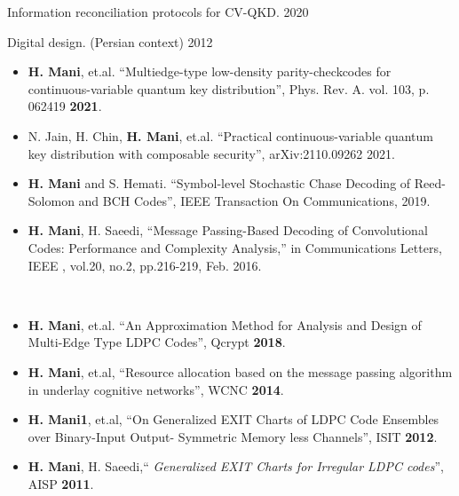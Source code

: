 \documentclass[letterpaper]{hosmacv} %
\begin{document}
\begin{hosmashort}
{Information reconciliation  protocols  for  CV-QKD.}
{2020}

{Digital design. (Persian context)}
{2012}

{
\begin{itemize} %
    \item \textbf{H. Mani}, et.al. ``Multiedge-type   low-density   parity-checkcodes   for   continuous-variable   quantum   key   distribution'', Phys. Rev. A. vol. 103, p. 062419 \textbf{2021}.
    \item N. Jain, H. Chin, \textbf{H. Mani}, et.al. ``Practical continuous-variable quantum key distribution with composable security'', 	arXiv:2110.09262 2021.
    \item \textbf{H. Mani} and S. Hemati. ``Symbol-level Stochastic Chase Decoding of Reed-Solomon and BCH Codes'', IEEE Transaction On Communications, 2019.
    \item \textbf{H. Mani}, H. Saeedi, ``Message Passing-Based Decoding of Convolutional Codes: Performance and Complexity Analysis,'' in Communications Letters, IEEE , vol.20, no.2, pp.216-219, Feb. 2016.
\end{itemize}
}{}\\

{\begin{itemize}
    \item \textbf{H. Mani}, et.al.
``{An Approximation Method for Analysis and Design of Multi-Edge Type LDPC Codes}'', Qcrypt \textbf{2018}.
\item \textbf{H. Mani}, et.al, ``{Resource allocation based on the message
passing algorithm in underlay cognitive networks}'', WCNC \textbf{2014}.
\item \textbf{H. Mani1}, et.al, ``{On Generalized EXIT Charts of LDPC Code
Ensembles over Binary-Input Output- Symmetric Memory less Channels}'', ISIT \textbf{2012}.
\item \textbf{H. Mani}, H. Saeedi,``{ \textit{Generalized EXIT Charts for Irregular LDPC codes}}'', AISP \textbf{2011}.
\end{itemize}}
{}

\end{hosmashort}
\end{document}
